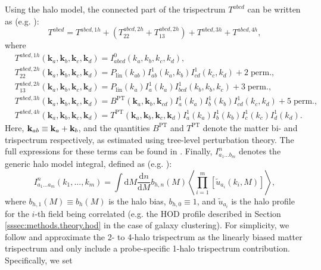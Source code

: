 \documentclass[a4paper,11pt]{article}
\begin{document}
    Using the halo model, the connected part of the trispectrum $T^{abcd}$ can be written as (e.g. \cite{Takada:2013}):
    \begin{equation}
      T^{abcd} = T^{abcd, 1h} + (T^{abcd, 2h}_{22} + T^{abcd, 2h}_{13}) + T^{abcd, 3h} + T^{abcd, 4h},
    \end{equation}
    where
    \begin{equation}
    \begin{aligned}
      &T^{abcd, 1h}(\mathbf{k}_{a}, \mathbf{k}_{b}, \mathbf{k}_{c}, \mathbf{k}_{d}) = I^{0}_{abcd}(k_{a}, k_{b}, k_{c}, k_{d}), \\
      &T^{abcd, 2h}_{22}(\mathbf{k}_{a}, \mathbf{k}_{b}, \mathbf{k}_{c}, \mathbf{k}_{d}) = P_{\mathrm{lin}}(k_{ab})I^{1}_{ab}(k_{a}, k_{b})I^{1}_{cd}(k_{c}, k_{d}) + 2 \; \mathrm{perm.}, \\
      &T^{abcd, 2h}_{13}(\mathbf{k}_{a}, \mathbf{k}_{b}, \mathbf{k}_{c}, \mathbf{k}_{d}) = P_{\mathrm{lin}}(k_{a})I^{1}_{a}(k_{a})I^{1}_{bcd}(k_{b}, k_{b}, k_{c}) + 3 \; \mathrm{perm.}, \\
      &T^{abcd, 3h}(\mathbf{k}_{a}, \mathbf{k}_{b}, \mathbf{k}_{c}, \mathbf{k}_{d}) = B^{\mathrm{PT}}(\mathbf{k}_{a}, \mathbf{k}_{b}, \mathbf{k}_{cd})I^{1}_{a}(k_{a})I^{1}_{b}(k_{b})I^{1}_{cd}(k_{c}, k_{d}) + 5 \; \mathrm{perm.},\\
      &T^{abcd, 4h}(\mathbf{k}_{a}, \mathbf{k}_{b}, \mathbf{k}_{c}, \mathbf{k}_{d}) = T^{\mathrm{PT}}(\mathbf{k}_{a}, \mathbf{k}_{b}, \mathbf{k}_{c}, \mathbf{k}_{d})I^{1}_{a}(k_{a})I^{1}_{b}(k_{b})I^{1}_{c}(k_{c})I^{1}_{d}(k_{d}).
    \label{eq:halo-mod-trisp}
    \end{aligned}
    \end{equation}
    Here, ${\bf k}_{ab}\equiv {\bf k}_a+{\bf k}_b$, and the quantities $B^{\mathrm{PT}}$ and $T^{\mathrm{PT}}$ denote the matter bi- and trispectrum respectively, as estimated using tree-level perturbation theory. The full expressions for these terms can be found in \cite{Takada:2013}. Finally, $I^{n}_{a_1...b_m}$ denotes the generic halo model integral, defined as (e.g. \cite{Krause:2017}):
    \begin{equation}
      I^{n}_{a_1...a_m}(k_1,...,k_m) = \int \mathrm{d}M \frac{\mathrm{d}n}{\mathrm{d}M}b_{h, n}(M)  \left\langle\prod_{i=1}^m \left[\tilde{u}_{a_i}(k_i, M) \right]\right\rangle, 
      \label{eq:halo-mod-intg}
    \end{equation}
    where $b_{h,1}(M)\equiv b_h(M)$ is the halo bias, $b_{h,0}\equiv1$, and $\tilde{u}_{a_i}$ is the halo profile for the $i$-th field being correlated (e.g. the HOD profile described in Section \ref{sssec:methods.theory.hod} in the case of galaxy clustering). For simplicity, we follow \cite{Krause:2017} and approximate the 2- to 4-halo trispectrum as the linearly biased matter trispectrum and only include a probe-specific 1-halo trispectrum contribution. Specifically, we set 
\end{document}
